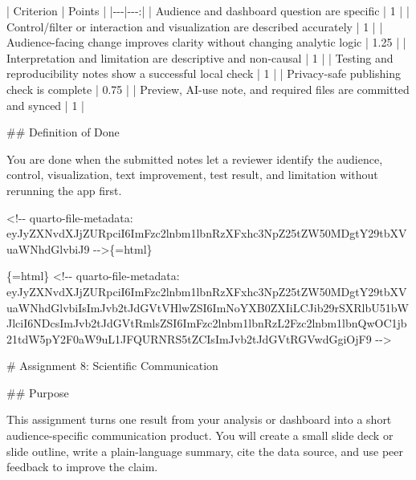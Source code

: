 \documentclass[
  letterpaper,
  DIV=11,
  numbers=noendperiod,
  oneside]{scrreprt}
\newenvironment{Shaded}{\begin{snugshade}}{\end{snugshade}}
\newcommand{\FunctionTok}[1]{\textcolor[rgb]{0.28,0.35,0.67}{#1}}
\newcommand{\InformationTok}[1]{\textcolor[rgb]{0.37,0.37,0.37}{#1}}
\newcommand{\NormalTok}[1]{\textcolor[rgb]{0.00,0.23,0.31}{#1}}
\newcommand{\PreprocessorTok}[1]{\textcolor[rgb]{0.68,0.00,0.00}{#1}}
\begin{document}
\begin{Shaded}
\begin{Highlighting}[numbers=left,,]
\PreprocessorTok{|}\NormalTok{ Criterion }\PreprocessorTok{|}\NormalTok{ Points }\PreprocessorTok{|}
\PreprocessorTok{|{-}{-}{-}|{-}{-}{-}:|}
\PreprocessorTok{|}\NormalTok{ Audience and dashboard question are specific }\PreprocessorTok{|}\NormalTok{ 1 }\PreprocessorTok{|}
\PreprocessorTok{|}\NormalTok{ Control/filter or interaction and visualization are described accurately }\PreprocessorTok{|}\NormalTok{ 1 }\PreprocessorTok{|}
\PreprocessorTok{|}\NormalTok{ Audience{-}facing change improves clarity without changing analytic logic }\PreprocessorTok{|}\NormalTok{ 1.25 }\PreprocessorTok{|}
\PreprocessorTok{|}\NormalTok{ Interpretation and limitation are descriptive and non{-}causal }\PreprocessorTok{|}\NormalTok{ 1 }\PreprocessorTok{|}
\PreprocessorTok{|}\NormalTok{ Testing and reproducibility notes show a successful local check }\PreprocessorTok{|}\NormalTok{ 1 }\PreprocessorTok{|}
\PreprocessorTok{|}\NormalTok{ Privacy{-}safe publishing check is complete }\PreprocessorTok{|}\NormalTok{ 0.75 }\PreprocessorTok{|}
\PreprocessorTok{|}\NormalTok{ Preview, AI{-}use note, and required files are committed and synced }\PreprocessorTok{|}\NormalTok{ 1 }\PreprocessorTok{|}

\FunctionTok{\#\# Definition of Done}

\NormalTok{You are done when the submitted notes let a reviewer identify the audience, control, visualization, text improvement, test result, and limitation without rerunning the app first.}


\InformationTok{\textasciigrave{}\textless{}!{-}{-} quarto{-}file{-}metadata: eyJyZXNvdXJjZURpciI6ImFzc2lnbm1lbnRzXFxhc3NpZ25tZW50MDgtY29tbXVuaWNhdGlvbiJ9 {-}{-}\textgreater{}\textasciigrave{}}\NormalTok{\{=html\}}

\InformationTok{\textasciigrave{}\textasciigrave{}\textasciigrave{}\{=html\}}
\InformationTok{\textless{}!{-}{-} quarto{-}file{-}metadata: eyJyZXNvdXJjZURpciI6ImFzc2lnbm1lbnRzXFxhc3NpZ25tZW50MDgtY29tbXVuaWNhdGlvbiIsImJvb2tJdGVtVHlwZSI6ImNoYXB0ZXIiLCJib29rSXRlbU51bWJlciI6NDcsImJvb2tJdGVtRmlsZSI6ImFzc2lnbm1lbnRzL2Fzc2lnbm1lbnQwOC1jb21tdW5pY2F0aW9uL1JFQURNRS5tZCIsImJvb2tJdGVtRGVwdGgiOjF9 {-}{-}\textgreater{}}
\InformationTok{\textasciigrave{}\textasciigrave{}\textasciigrave{}}

\FunctionTok{\# Assignment 8: Scientific Communication }


\FunctionTok{\#\# Purpose}

\NormalTok{This assignment turns one result from your analysis or dashboard into a short audience{-}specific communication product. You will create a small slide deck or slide outline, write a plain{-}language summary, cite the data source, and use peer feedback to improve the claim.}


\end{Highlighting}
\end{Shaded}
\end{document}
